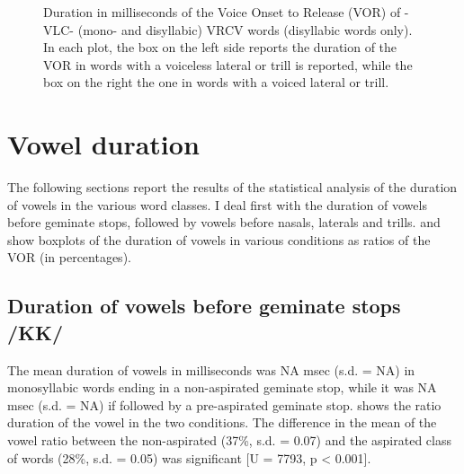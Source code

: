 \documentclass[11pt,a4paper,oneside,openany]{memoir}\usepackage[]{graphicx}\usepackage[]{color}
\newenvironment{knitrout}{}{} %
\begin{document}
\begin{figure}
\begin{subfigure}{.5\textwidth}
\begin{knitrout}
\end{knitrout}
\end{subfigure}
\caption[Duration in milliseconds of the Voice Onset to Release (VOR) of -VLC- and VRCV words.]{Duration in milliseconds of the Voice Onset to Release (VOR) of -VLC- (mono- and disyllabic) VRCV words (disyllabic words only).
In each plot, the box on the left side reports the duration of the VOR in words with a voiceless lateral or trill is reported, while the box on the right the one in words with a voiced lateral or trill.}
\label{f:vor-rho}
\end{figure}


\section{Vowel duration}
\label{s:vow-dur}

The following sections report the results of the statistical analysis of the duration of vowels in the various word classes.
I deal first with the duration of vowels before geminate stops, followed by vowels before nasals, laterals and trills.
 and  show boxplots of the duration of vowels in various conditions as ratios of the VOR (in percentages).

\subsection{Duration of vowels before geminate stops /KK/}


The mean duration of vowels in milliseconds was NA msec (s.d. = NA) in monosyllabic words ending in a non-aspirated geminate stop, while it was NA msec (s.d. = NA) if followed by a pre-aspirated geminate stop.
 shows the ratio duration of the vowel in the two conditions.
The difference in the mean of the vowel ratio between the non-aspirated (37\%, s.d. = 0.07) and the aspirated class of words (28\%, s.d. = 0.05) was significant [U = 7793, p < 0.001].
\end{document}
